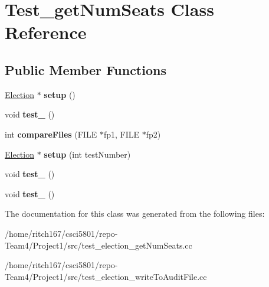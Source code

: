 \hypertarget{classTest__getNumSeats}{}\section{Test\+\_\+get\+Num\+Seats Class Reference}
\label{classTest__getNumSeats}
\subsection*{Public Member Functions}
\begin{DoxyCompactItemize}
\item 
\mbox{\label{classTest__getNumSeats_a3c74995dfc14ac0d97d9858870bd8f3b}} 
\hyperlink{classElection}{Election} $\ast$ {\bfseries setup} ()
\item 
\mbox{\label{classTest__getNumSeats_ada242656fec527ba3cbc996d6554c6cb}} 
void {\bfseries test\+\_} ()
\item 
\mbox{\label{classTest__getNumSeats_af97c3c67e8d37302d3b70ca03adccee3}} 
int {\bfseries compare\+Files} (F\+I\+LE $\ast$fp1, F\+I\+LE $\ast$fp2)
\item 
\mbox{\label{classTest__getNumSeats_a297b29300599dada5e0ae509e893dd7e}} 
\hyperlink{classElection}{Election} $\ast$ {\bfseries setup} (int test\+Number)
\item 
\mbox{\label{classTest__getNumSeats_ada242656fec527ba3cbc996d6554c6cb}} 
void {\bfseries test\+\_} ()
\item 
\mbox{\label{classTest__getNumSeats_a19726529db9e43c2393839abd0427fd1}} 
void {\bfseries test\+\_} ()
\end{DoxyCompactItemize}


The documentation for this class was generated from the following files\+:\begin{DoxyCompactItemize}
\item 
/home/ritch167/csci5801/repo-\/\+Team4/\+Project1/src/test\+\_\+election\+\_\+get\+Num\+Seats.\+cc\item 
/home/ritch167/csci5801/repo-\/\+Team4/\+Project1/src/test\+\_\+election\+\_\+write\+To\+Audit\+File.\+cc\end{DoxyCompactItemize}
